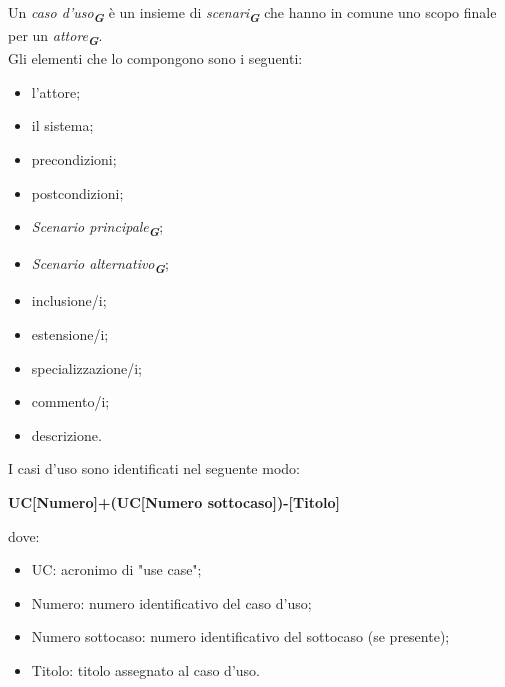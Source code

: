 Un \emph{caso d'uso}\textsubscript{\textit{\textbf{G}}} è un insieme di \emph{scenari}\textsubscript{\textit{\textbf{G}}} che hanno in comune uno scopo finale per un \emph{attore}\textsubscript{\textit{\textbf{G}}}.\\
Gli elementi che lo compongono sono i seguenti:
\begin{itemize}
    \item l'attore;
    \item il sistema;
    \item precondizioni;
    \item postcondizioni;
    \item \emph{Scenario principale}\textsubscript{\textit{\textbf{G}}};
    \item \emph{Scenario alternativo}\textsubscript{\textit{\textbf{G}}};
    \item inclusione/i;
    \item estensione/i;
    \item specializzazione/i;
    \item commento/i;
    \item descrizione.  
\end{itemize}
I casi d’uso sono identificati nel seguente modo:\\
\begin{center}
    \textbf{UC[Numero]+(UC[Numero sottocaso])-[Titolo]}
\end{center}
dove:
\begin{itemize}
    \item UC: acronimo di "use case";
    \item Numero: numero identificativo del caso d’uso;
    \item Numero sottocaso: numero identificativo del sottocaso (se presente);
    \item Titolo: titolo assegnato al caso d’uso.
\end{itemize}

